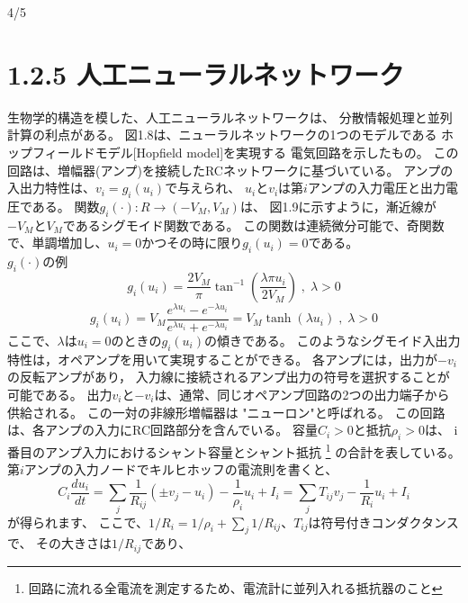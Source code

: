 \documentclass{jsarticle}
\begin{document}
4/5

\section*{1.2.5 人工ニューラルネットワーク}
    生物学的構造を模した、人工ニューラルネットワークは、
    分散情報処理と並列計算の利点がある。
    図1.8は、ニューラルネットワークの1つのモデルである
    ホップフィールドモデル[Hopfield model]を実現する
    電気回路を示したもの。
    この回路は、増幅器(アンプ)を接続したRCネットワークに基づいている。
    アンプの入出力特性は、$v_i = g_i(u_i)$で与えられ、
    $u_i$と$v_i$は第$i$アンプの入力電圧と出力電圧である。
    関数$g_i(\cdot) \colon R \rightarrow (-V_M,V_M)$は、
    図1.9に示すように，漸近線が$-V_M$と$V_M$であるシグモイド関数である。
    この関数は連続微分可能で、奇関数で、単調増加し、$u_i = 0$かつその時に限り$g_i(u_i) = 0$である。\\
    $g_i(\cdot)$の例
    \begin{equation*}
        g_i(u_i) = \frac{2V_M}{\pi} \tan^{-1}\left(\frac{\lambda \pi u_i}{2V_M}\right)\;,\;\lambda>0
    \end{equation*}
    \begin{equation*}
        g_i(u_i) = V_M\frac{e^{\lambda u_i}-e^{-\lambda u_i}}{e^{\lambda u_i}+e^{-\lambda u_i}} = V_M \tanh (\lambda u_i)\;,\;\lambda>0
    \end{equation*}
    ここで、$\lambda$は$u_i = 0$のときの$g_i (u_i)$の傾きである。
    このようなシグモイド入出力特性は，オペアンプを用いて実現することができる。
    各アンプには，出力が$-v_i$の反転アンプがあり，
    入力線に接続されるアンプ出力の符号を選択することが可能である。
    出力$v_i$と$-v_i$は、通常、同じオペアンプ回路の2つの出力端子から供給される。
    この一対の非線形増幅器は "ニューロン"と呼ばれる。
    この回路は、各アンプの入力にRC回路部分を含んでいる。
    容量$C_i> 0$と抵抗$\rho_i > 0$は、
    i番目のアンプ入力におけるシャント容量とシャント抵抗
    \footnote{回路に流れる全電流を測定するため、電流計に並列入れる抵抗器のこと}
    の合計を表している。
    第$i$アンプの入力ノードでキルヒホッフの電流則を書くと、
    \begin{equation*}
        C_i\frac{du_i}{dt} = \sum_j \frac{1}{R_{ij}}(\pm v_j - u_i)-\frac{1}{\rho_i}u_i+I_i 
        = \sum_j T_{ij}v_j-\frac{1}{R_i}u_i+I_i  
    \end{equation*}
    が得られます、
    ここで、$1/R_i = 1/\rho_i + \sum_j 1/R_{ij}$、$T_{ij}$は符号付きコンダクタンスで、
    その大きさは$1/R_{ij}$であり、
\end{document}
